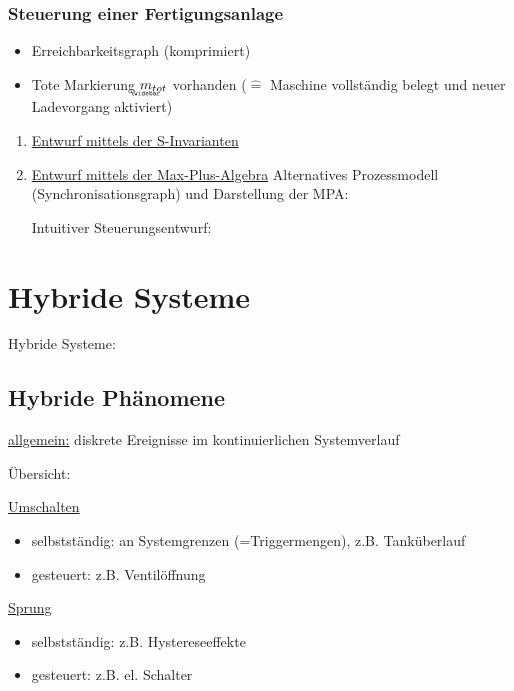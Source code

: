 \subsubsection{Steuerung einer Fertigungsanlage}


\begin{itemize}
	\item Erreichbarkeitsgraph (komprimiert) 
	\item Tote Markierung $\wbar{m}_{tot}$ vorhanden ($\hat{=}$ Maschine vollständig belegt und neuer Ladevorgang aktiviert)
\end{itemize}

\begin{enumerate}
	\item \underline{Entwurf mittels der S-Invarianten }
	\item \underline{Entwurf mittels der Max-Plus-Algebra}
	Alternatives Prozessmodell (Synchronisationsgraph) und Darstellung der MPA: 
	
	Intuitiver Steuerungsentwurf: 
\end{enumerate}


\section{Hybride Systeme}
Hybride Systeme: 

\subsection{Hybride Phänomene}
\underline{allgemein:} diskrete Ereignisse im kontinuierlichen Systemverlauf

Übersicht: 

\underline{Umschalten}
\begin{itemize}
	\item selbstständig: an Systemgrenzen (=Triggermengen), z.B. Tanküberlauf
	\item gesteuert: z.B. Ventilöffnung
\end{itemize}

\underline{Sprung}
\begin{itemize}
	\item selbstständig: z.B. Hystereseeffekte
	\item gesteuert: z.B. el. Schalter
\end{itemize}

